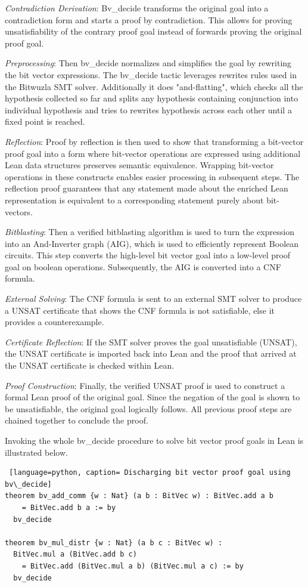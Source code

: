 \textit{Contradiction Derivation}: Bv\_decide transforms the original goal into a contradiction form and starts a proof by contradiction. This allows for proving unsatisfiability of the contrary proof goal instead of forwards proving the original proof goal. 

\textit{Preprocessing}: Then bv\_decide normalizes and simplifies the goal by rewriting the bit vector expressions. The bv\_decide tactic leverages rewrites rules used in the Bitwuzla SMT solver. Additionally it does "and-flatting", which checks all the hypothesis collected so far and splits any hypothesis containing conjunction into individual hypothesis and tries to rewrites hypothesis across each other until a fixed point is reached.

\textit{Reflection}: Proof by reflection is then used to show that transforming a bit-vector proof goal into a form where bit-vector operations are expressed using additional Lean data structures preserves semantic equivalence. Wrapping bit-vector operations in these constructs enables easier processing in subsequent steps. The reflection proof guarantees that any statement made about the enriched Lean representation is equivalent to a corresponding statement purely about bit-vectors.

\textit{Bitblasting}: Then a  verified bitblasting algorithm is used to turn the expression into an And-Inverter graph (AIG), which is used to efficiently represent Boolean circuits. This step converts the high-level bit vector goal into a low-level proof goal on boolean operations. Subsequently, the AIG is converted into a CNF formula. 

\textit{External Solving}: The CNF formula is sent to an external SMT solver to produce a UNSAT certificate that shows the CNF formula is not satisfiable, else it provides a counterexample.

\textit{Certificate Reflection}: If the SMT solver proves the goal unsatisfiable (UNSAT), the UNSAT certificate is imported back into Lean and the proof that arrived at the UNSAT certificate is checked within Lean.

\textit{Proof Construction}: Finally, the verified UNSAT proof is used to construct a formal Lean proof of the original goal. Since the negation of the goal is shown to be unsatisfiable, the original goal logically follows. All previous proof steps are chained together to conclude the proof.

Invoking the whole bv\_decide procedure to solve bit vector proof goals in Lean is illustrated below.
\begin{lstlisting} [language=python, caption= Discharging bit vector proof goal using bv\_decide]
theorem bv_add_comm {w : Nat} (a b : BitVec w) : BitVec.add a b 
    = BitVec.add b a := by
  bv_decide

theorem bv_mul_distr {w : Nat} (a b c : BitVec w) : 
  BitVec.mul a (BitVec.add b c) 
    = BitVec.add (BitVec.mul a b) (BitVec.mul a c) := by
  bv_decide
\end{lstlisting}

